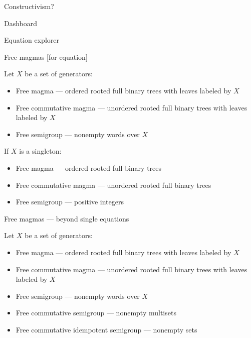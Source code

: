\documentclass{beamer}
\begin{document}
\begin{frame}{Constructivism?}
\end{frame}


\begin{frame}{Dashboard}
\end{frame}


\begin{frame}{Equation explorer}
\end{frame}


\begin{frame}{Free magmas [for equation]}

Let $X$ be a set of generators:
\begin{itemize}
	\pause \item Free magma --- \pause ordered rooted full binary trees with leaves labeled by $X$
	\pause \item Free commutative magma --- \pause unordered rooted full binary trees with leaves labeled by $X$
	\pause \item Free semigroup --- \pause nonempty words over $X$
\end{itemize}
\pause
If $X$ is a singleton:
\begin{itemize}
	\pause \item Free magma --- \pause ordered rooted full binary trees
	\pause \item Free commutative magma --- \pause unordered rooted full binary trees
	\pause \item Free semigroup --- \pause positive integers
\end{itemize}

\end{frame}


\begin{frame}{Free magmas --- beyond single equations}

Let $X$ be a set of generators:
\begin{itemize}
	\item Free magma --- ordered rooted full binary trees with leaves labeled by $X$
	\item Free commutative magma --- unordered rooted full binary trees with leaves labeled by $X$
	\item Free semigroup --- nonempty words over $X$
	\pause \item Free commutative semigroup --- \pause nonempty multisets
	\pause \item Free commutative idempotent semigroup --- \pause nonempty sets
\end{itemize}

\end{frame}
\end{document}
